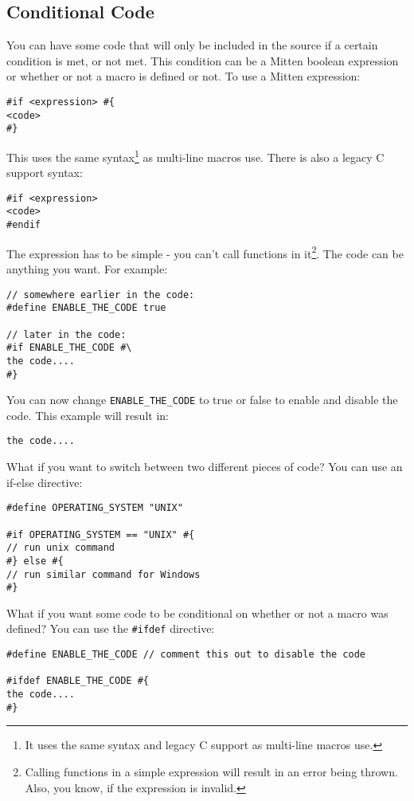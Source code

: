 \documentclass[10pt,a4paper]{article}
\begin{document}
\newpage




\subsection{Conditional Code}
You can have some code that will only be included in the source if a certain condition is met, or not met. This condition can be a Mitten boolean expression or whether or not a macro is defined or not. To use a Mitten expression:
\begin{verbatim}
#if <expression> #{
<code>
#}
\end{verbatim}

This uses the same syntax\footnote{It uses the same syntax and legacy C support as multi-line macros use.} as multi-line macros use. There is also a legacy C support syntax:
\begin{verbatim}
#if <expression>
<code>
#endif
\end{verbatim}

The expression has to be simple - you can't call functions in it\footnote{Calling functions in a simple expression will result in an error being thrown. Also, you know, if the expression is invalid.}. The code can be anything you want. For example:
\begin{verbatim}
// somewhere earlier in the code:
#define ENABLE_THE_CODE true

// later in the code:
#if ENABLE_THE_CODE #\
the code....
#}
\end{verbatim}

You can now change \verb|ENABLE_THE_CODE| to true or false to enable and disable the code. This example will result in:
\begin{verbatim}
the code....
\end{verbatim}

What if you want to switch between two different pieces of code? You can use an if-else directive:
\begin{verbatim}
#define OPERATING_SYSTEM "UNIX"

#if OPERATING_SYSTEM == "UNIX" #{
// run unix command
#} else #{
// run similar command for Windows
#}
\end{verbatim}

What if you want some code to be conditional on whether or not a macro was defined? You can use the \verb|#ifdef| directive:
\begin{verbatim}
#define ENABLE_THE_CODE // comment this out to disable the code

#ifdef ENABLE_THE_CODE #{
the code....
#}
\end{verbatim}
\end{document}
